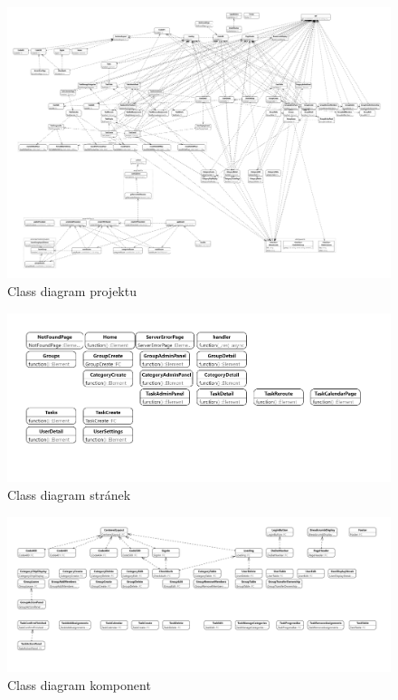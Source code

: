 \documentclass[a4paper,12pt]{report}
\begin{document}
\begin{landscape}
\begin{figure}[hbt!]
	\includegraphics[width=1\linewidth, height=0.55\linewidth]{img/ClassDiagramy/src_diagram_export.png}
	\caption{Class diagram projektu}
	\label{fig:enter-label}
\end{figure}
\pagebreak
\begin{figure}[hbt!]
	\centering
	\includegraphics[width=1\linewidth]{img/ClassDiagramy/pages_diagram.png}
	\caption{Class diagram stránek}
\end{figure}
\begin{figure}[hbt!]
	\centering
	\includegraphics[width=1\linewidth]{img/ClassDiagramy/components_diagram.png}
	\caption{Class diagram komponent}
\end{figure}

\end{landscape}
\end{document}

